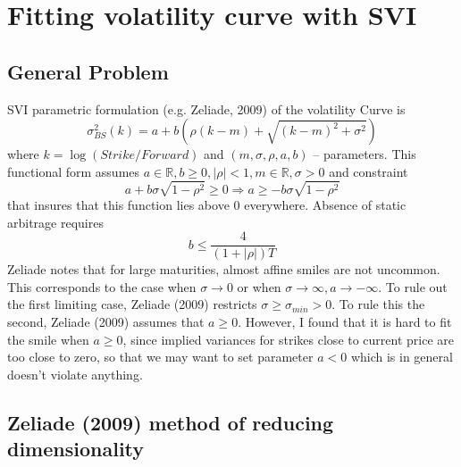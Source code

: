 \documentclass[12pt]{article}
\begin{document}
\section{Fitting volatility curve with SVI}

\subsection{General Problem}

SVI parametric formulation (e.g. Zeliade, 2009) of the volatility Curve is
\[\sigma^2_{BS}(k) = a + b\left(\rho (k-m) + \sqrt{(k-m)^2 + \sigma^2}\right)\]
where $k = \log(Strike/Forward)$ and $(m, \sigma, \rho, a, b)$ -- parameters. This functional form assumes $a\in \mathbb{R}, b\ge 0, |\rho| < 1, m\in \mathbb{R}, \sigma > 0$ and constraint 
\[a + b\sigma\sqrt{1-\rho^2} \ge 0 \Rightarrow a \ge - b\sigma\sqrt{1-\rho^2}\]
that insures that this function lies above $0$ everywhere. Absence of static arbitrage requires
\[b \le \frac{4}{(1+|\rho|)T}\]
Zeliade notes that for large maturities, almost affine smiles are not uncommon. This corresponds to the case when $\sigma \to 0$ or when $\sigma \to \infty, a \to -\infty$. To rule out the first limiting case, Zeliade (2009) restricts $\sigma \ge \sigma_{min} > 0$. To rule this the second, Zeliade (2009) assumes that $a \ge 0$. However, I found that it is hard to fit the smile when $a \ge 0$, since implied variances for strikes close to current price are too close to zero, so that we may want to set parameter $a < 0$ which is in general doesn't violate anything. 

\subsection{Zeliade (2009) method of reducing dimensionality}
\end{document}
